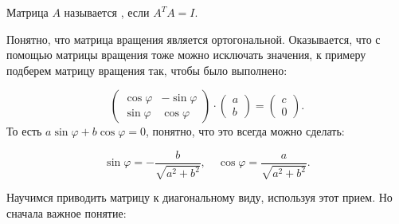 \begin{definition}
    Матрица $A$ называется , если $A^TA=I$.
\end{definition}

Понятно, что матрица вращения является ортогональной. Оказывается, что с помощью матрицы вращения
тоже можно исключать значения, к примеру подберем матрицу вращения так, чтобы было выполнено:

\[
    \left(
    \begin{array}{cc}
            \cos\varphi & -\sin\varphi \\
            \sin\varphi & \cos\varphi
        \end{array}
    \right)\cdot
    \left(
    \begin{array}{c}
            a \\
            b
        \end{array}
    \right)=
    \left(
    \begin{array}{c}
            c \\
            0
        \end{array}
    \right).
\]
То есть $a\sin\varphi+b\cos\varphi=0$, понятно, что это всегда можно сделать:

\[
    \sin\varphi=-\dfrac{b}{\sqrt{a^2+b^2}},\quad \cos\varphi=\dfrac{a}{\sqrt{a^2+b^2}}.
\]

Научимся приводить матрицу к диагональному виду, используя этот прием. Но сначала важное понятие:

